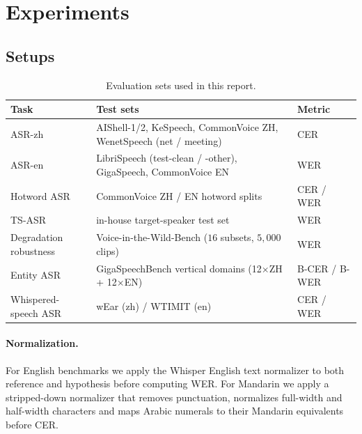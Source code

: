 \section{Experiments}
\label{sec:experiments}

\subsection{Setups}
\label{subsec:setup}

\begin{table}[t]
  \caption{Evaluation sets used in this report.}
  \label{tab:eval}
  \centering
  \small
  \begin{tabular}{lp{6.2cm}l}
    \toprule
    Task & Test sets & Metric \\
    \midrule
    ASR-zh           & AIShell-1/2, KeSpeech, CommonVoice ZH,
                       WenetSpeech (net / meeting)                                & CER \\
    ASR-en           & LibriSpeech (test-clean / -other), GigaSpeech,
                       CommonVoice EN                                             & WER \\
    Hotword ASR      & CommonVoice ZH / EN hotword splits                         & CER / WER \\
    TS-ASR           & in-house target-speaker test set
                                                                                & WER \\
    Degradation robustness & Voice-in-the-Wild-Bench \cite{xie2026mega}
                       ($16$ subsets, $5{,}000$ clips)                            & WER \\
    Entity ASR         & GigaSpeechBench vertical domains
                       (12$\times$ZH + 12$\times$EN) \cite{tu2026gigaspeechbench}
                                                                                & B-CER / B-WER \\
    Whispered-speech ASR & wEar (zh) / WTIMIT (en) \cite{fang2025whisperear}      & CER / WER \\
    \bottomrule
  \end{tabular}
\end{table}

\paragraph{Normalization.}
For English benchmarks we apply the Whisper English text normalizer
\cite{radford2023whisper} to both reference and hypothesis before
computing WER. For Mandarin we apply a stripped-down normalizer that
removes punctuation, normalizes full-width and half-width characters
and maps Arabic numerals to their Mandarin equivalents before CER.

